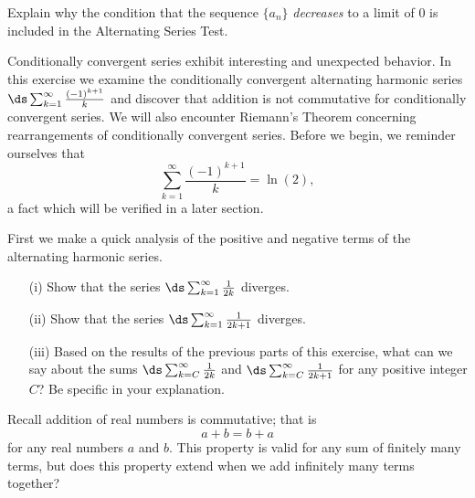 \begin{exercises}
\begin{exerciseSolution}
\end{exerciseSolution}

    \item Explain why the condition that the sequence $\{a_n\}$ \emph{decreases} to a limit of 0 is included in the Alternating Series Test. 
    
        \ea

\item Conditionally convergent series exhibit interesting and unexpected behavior. In this exercise we examine the conditionally convergent alternating harmonic series $\ds \sum_{k=1}^{\infty} \frac{(-1)^{k+1}}{k}$ and discover that addition is not commutative for conditionally convergent series. We will also encounter Riemann's Theorem concerning rearrangements of conditionally convergent series. Before we begin, we reminder ourselves that
    \[\sum_{k=1}^{\infty} \frac{(-1)^{k+1}}{k} = \ln(2),\]
    a fact which will be verified in a later section.
\ba
\item First we make a quick analysis of the positive and negative terms of the alternating harmonic series.
    \begin{itemize}
    \item[(i)] Show that the series $\ds \sum_{k=1}^{\infty} \frac{1}{2k}$ diverges.


    \item[(ii)] Show that the series $\ds \sum_{k=1}^{\infty} \frac{1}{2k+1}$ diverges.


    \item[(iii)] Based on the results of the previous parts of this exercise, what can we say about the sums $\ds \sum_{k=C}^{\infty} \frac{1}{2k}$ and $\ds \sum_{k=C}^{\infty} \frac{1}{2k+1}$ for any positive integer $C$? Be specific in your explanation.

    \end{itemize}

\item Recall addition of real numbers is commutative; that is
\[a + b = b + a\]
for any real numbers $a$ and $b$. This property is valid for any sum of finitely many terms, but does this property extend when we add infinitely many terms together?


\end{exercises}
